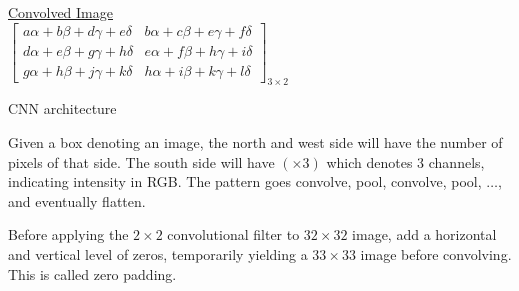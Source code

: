 \documentclass[12pt, letterpaper]{article}
\begin{document}
\begin{center}
    \underline{Convolved Image} \\
    $\begin{bmatrix}
        a\alpha + b\beta + d\gamma + e\delta & b\alpha + c\beta + e\gamma + f\delta \\
        d\alpha + e\beta + g\gamma + h\delta & e\alpha + f\beta + h\gamma + i\delta \\
        g\alpha + h\beta + j\gamma + k\delta & h\alpha + i\beta + k\gamma + l\delta 
    \end{bmatrix}_{3\times 2}$
\end{center}
 CNN architecture 

Given a box denoting an image, the north and west side will have the number of pixels of that side.
The south side will have $(\times 3)$ which denotes 3 channels, indicating intensity
in RGB. The pattern goes convolve, pool, convolve, pool, $\dots$, and eventually flatten.

Before applying the $2\times 2$ convolutional filter to $32\times 32$ image, add a horizontal
and vertical level of zeros, temporarily yielding a $33\times 33$ image before convolving. This is
called zero padding.
\end{document}
